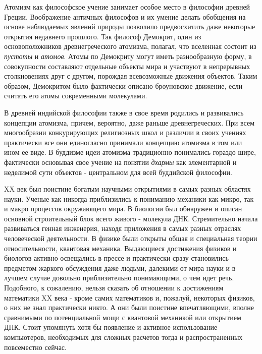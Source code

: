 Атомизм как философское учение занимает особое место в философии древней Греции.
Воображение античных философов и их умение делать обобщения на основе наблюдаемых явлений природы позволило предвосхитить даже некоторые открытия недавнего прошлого.
Так философ Демокрит, один из основоположников древнегреческого атомизма, полагал, что вселенная состоит из \textit{пустоты} и \textit{атомов}. Атомы по Демокриту могут иметь разнообразную форму, в совокупности составляют отдельные объекты мира и участвуют в непрерывных столкновениях друг с другом, порождая всевозможные движения объектов.
Таким образом, Демокритом было фактически описано броуновское движение, если считать его атомы современными молекулами.

В древней индийской философии также в свое время родились и развивались концепции атомизма, причем, вероятно, даже раньше древнегреческих.
При всем многообразии конкурирующих религиозных школ и различии в своих учениях практически все они единогласно принимали концепцию атомизма в том или ином ее виде.
В буддизме идеи атомизма традиционно понимались гораздо шире, фактически основывая свое учение на понятии \textit{дхармы} как элементарной и неделимой сути объектов - центральном для всей буддийской философии.




XX век был поистине богатым научными открытиями в самых разных областях науки. Ученые как никогда приблизились к пониманию механики как микро, так и макро процессов окружающего мира. В биологии был обнаружен и описан основной строительный блок всего живого - молекула ДНК. Стремительно начала развиваться генная инженерия, находя приложения в самых разных отраслях человеческой деятельности. В физике были открыты общая и специальная теории относительности, квантовая механика. Выдающиеся достижения физиков и биологов активно освещались в прессе и практически сразу становились предметом жаркого обсуждения даже людьми, далекими от мира науки и в лучшем случае довольно приблизительно понимающими, о чем идет речь. 
Подобного, к сожалению, нельзя сказать об отношении к достижениям математики XX века - кроме самих математиков и, пожалуй, некоторых физиков, о них не знал практически никто. А они были поистине впечатляющими, вполне сравнимыми по потенциальной мощи с квантовой механикой или открытием ДНК. Стоит упомянуть хотя бы появление и активное использование компьютеров, необходимых для сложных расчетов тогда и распространенных повсеместно сейчас.

